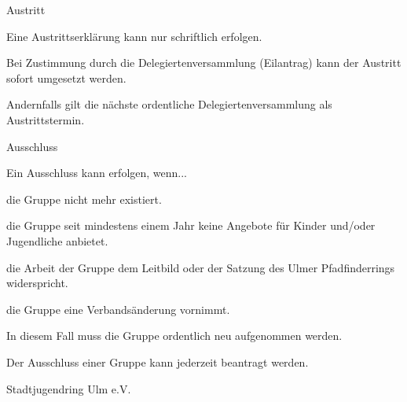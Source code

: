 \begin{legal}
\begin{legal}
            \item Austritt
                \begin{legal}
                    \item Eine Austrittserklärung kann nur schriftlich erfolgen.
                    \item Bei Zustimmung durch die Delegiertenversammlung (Eilantrag) kann der 
                          Austritt sofort umgesetzt werden.
                    \item Andernfalls gilt die nächste ordentliche Delegiertenversammlung als 
                          Austrittstermin.
                \end{legal}
            \item Ausschluss
                \begin{legal}
                    \item Ein Ausschluss kann erfolgen, wenn...
                        \begin{legal}
                            \item die Gruppe nicht mehr existiert.
                            \item die Gruppe seit mindestens einem Jahr keine Angebote für Kinder 
                                  und/oder Jugendliche anbietet.
                            \item die Arbeit der Gruppe dem Leitbild oder der Satzung des Ulmer 
                                  Pfadfinderrings widerspricht.
                            \item die Gruppe eine Verbandsänderung vornimmt.
                                \begin{legal}
                                    \item In diesem Fall muss die Gruppe ordentlich neu aufgenommen 
                                          werden.
                                \end{legal}
                        \end{legal}
                    \item Der Ausschluss einer Gruppe kann jederzeit beantragt werden.
                \end{legal}
        \end{legal}
    \item Stadtjugendring Ulm e.V.

\end{legal}
